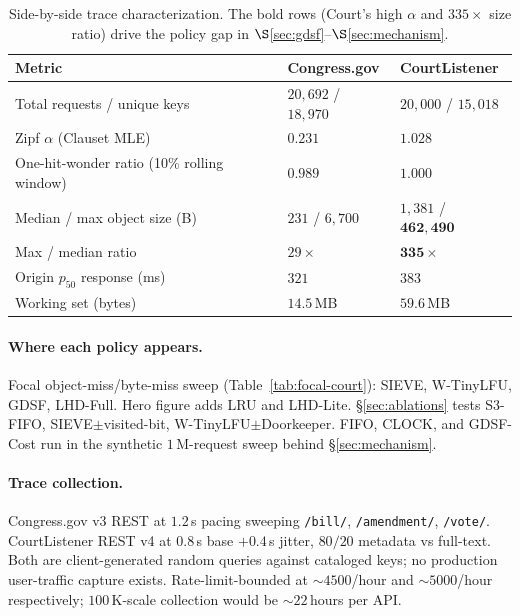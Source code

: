 \documentclass[letterpaper,twocolumn,10pt]{article}
\begin{document}
\begin{table}[t]
\centering
\footnotesize
\renewcommand{\arraystretch}{0.95}
\begin{tabularx}{\textwidth}{@{}lXX@{}}
\toprule
\textbf{Metric} & \textbf{Congress.gov} & \textbf{CourtListener} \\
\midrule
Total requests / unique keys & $20{,}692$ / $18{,}970$ & $20{,}000$ / $15{,}018$ \\
Zipf $\alpha$ (Clauset MLE)~\cite{clauset2009powerlaw} & $0.231$ & $1.028$ \\
One-hit-wonder ratio (10\% rolling window) & $0.989$ & $1.000$ \\
Median / max object size (B) & $231$ / $6{,}700$ & $1{,}381$ / $\mathbf{462{,}490}$ \\
Max / median ratio  & $29\times$ & $\mathbf{335\times}$ \\
Origin $p_{50}$ response (ms) & $321$ & $383$ \\
Working set (bytes) & $14.5$\,MB & $59.6$\,MB \\
\bottomrule
\end{tabularx}
\caption{Side-by-side trace characterization. The bold rows (Court's
high $\alpha$ and $335\times$ size ratio) drive the policy gap in
$\S$\ref{sec:gdsf}--$\S$\ref{sec:mechanism}.}
\label{tab:workload}
\end{table}

\paragraph{Where each policy appears.} Focal object-miss/byte-miss sweep
(Table~\ref{tab:focal-court}): SIEVE, W-TinyLFU, GDSF, LHD-Full.
Hero figure adds LRU and LHD-Lite. \S\ref{sec:ablations} tests
S3-FIFO, SIEVE$\pm$visited-bit, W-TinyLFU$\pm$Doorkeeper. FIFO,
CLOCK, and GDSF-Cost run in the synthetic $1$\,M-request sweep
behind \S\ref{sec:mechanism}.

\paragraph{Trace collection.} Congress.gov v3 REST at $1.2$\,s pacing
sweeping \texttt{/bill/}, \texttt{/amendment/}, \texttt{/vote/}.
CourtListener REST v4 at $0.8$\,s base $+ 0.4$\,s jitter, $80/20$
metadata vs full-text. Both are client-generated random queries against
cataloged keys; no production user-traffic capture exists.
Rate-limit-bounded at $\sim 4500$/hour and $\sim 5000$/hour respectively;
$100$\,K-scale collection would be $\sim 22$\,hours per API.
\end{document}
